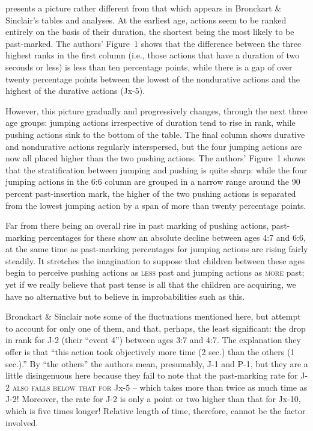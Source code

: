  presents a picture rather different from that which appears in Bronckart \& Sinclair's tables and analyses. At the earliest age, actions seem to be ranked entirely on the basis of their duration, the shortest being the most likely to be past-marked. The authors' Figure~1 shows that the difference between the three highest ranks in the first column (i.e., those actions that have a duration of two seconds or less) is less than ten percentage points, while there is a gap of over twenty percentage points between the lowest of the nondurative actions and the highest of the durative actions (Jx-5).

However, this picture gradually and progressively changes, through the next three age groups: jumping actions irrespective of duration tend to rise in rank, while pushing actions sink to the bottom of the table. The final column shows durative and nondurative actions regularly interspersed, but the four jumping actions are now all placed higher than the two pushing actions. The authors' Figure~1 shows that the stratification between jumping and pushing is quite sharp: while the
four jumping actions in the 6:6 column are grouped in a narrow range around the 90 percent past-insertion mark, the higher of the two pushing actions is separated from the lowest jumping action by a span of more than twenty percentage points.

Far from there being an overall rise in past marking of pushing actions, past-marking percentages for these show an absolute decline between ages 4:7 and 6:6, at the same time as past-marking percentages for jumping actions are rising fairly steadily. It stretches the imagina\-tion to suppose that children between these ages begin to perceive pushing actions as \textsc{less} past and jumping actions as \textsc{more} past; yet if we really believe that past tense is all that the children are acquiring, we have no alternative but to believe in improbabilities such as this.

Bronckart \& Sinclair note some of the fluctuations mentioned here, but attempt to account for only one of them, and that, perhaps, the least significant: the drop in rank for J-2 (their ``event 4'') be\-tween ages 3:7 and 4:7. The explanation they offer is that ``this action took objectively more time (2 sec.) than the others (1 sec.).'' By ``the others'' the authors mean, presumably, J-1 and P-1, but they are a little disingenuous here because they fail to note that the past-marking rate for J-2 \textsc{also falls below that for} Jx-5 -- which takes more than twice as much time as J-2! Moreover, the rate for J-2 is only a point or two higher than that for Jx-10, which is five times longer! Relative length of time, therefore, cannot be the factor involved.

